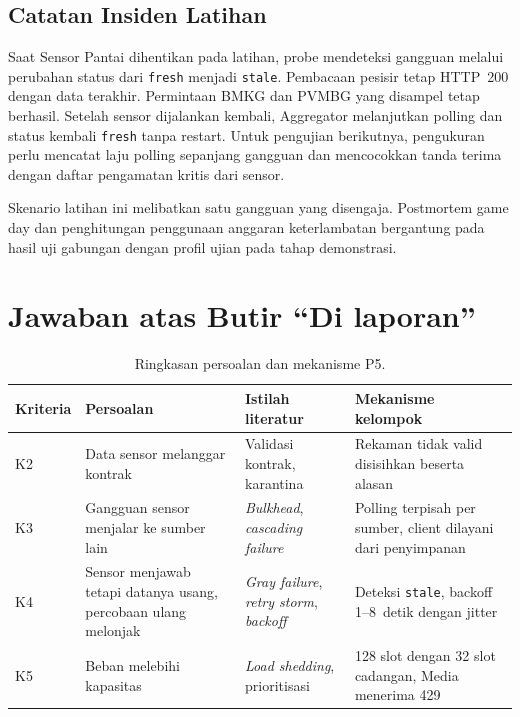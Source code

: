 \subsection{Catatan Insiden Latihan}

Saat Sensor Pantai dihentikan pada latihan, probe mendeteksi gangguan melalui perubahan status dari \texttt{fresh} menjadi \texttt{stale}. Pembacaan pesisir tetap HTTP~200 dengan data terakhir. Permintaan BMKG dan PVMBG yang disampel tetap berhasil. Setelah sensor dijalankan kembali, Aggregator melanjutkan polling dan status kembali \texttt{fresh} tanpa restart. Untuk pengujian berikutnya, pengukuran perlu mencatat laju polling sepanjang gangguan dan mencocokkan tanda terima dengan daftar pengamatan kritis dari sensor.

Skenario latihan ini melibatkan satu gangguan yang disengaja. Postmortem game day dan penghitungan penggunaan anggaran keterlambatan bergantung pada hasil uji gabungan dengan profil ujian pada tahap demonstrasi.

\section{Jawaban atas Butir ``Di laporan''}

\begin{table}[H]
\centering\small
\begin{tabularx}{\linewidth}{@{}>{\raggedright\arraybackslash}p{1.6cm}>{\raggedright\arraybackslash}p{3.4cm}>{\raggedright\arraybackslash}p{3.3cm}Y@{}}
\toprule
Kriteria & Persoalan & Istilah literatur & Mekanisme kelompok \\
\midrule
K2 & Data sensor melanggar kontrak & Validasi kontrak, karantina & Rekaman tidak valid disisihkan beserta alasan \\
K3 & Gangguan sensor menjalar ke sumber lain & \emph{Bulkhead}, \emph{cascading failure} & Polling terpisah per sumber, client dilayani dari penyimpanan \\
K4 & Sensor menjawab tetapi datanya usang, percobaan ulang melonjak & \emph{Gray failure}, \emph{retry storm}, \emph{backoff} & Deteksi \texttt{stale}, backoff 1--8~detik dengan jitter \\
K5 & Beban melebihi kapasitas & \emph{Load shedding}, prioritisasi & 128 slot dengan 32 slot cadangan, Media menerima 429 \\
\bottomrule
\end{tabularx}
\caption{Ringkasan persoalan dan mekanisme P5.}
\label{tab:p5-ringkas}
\end{table}

